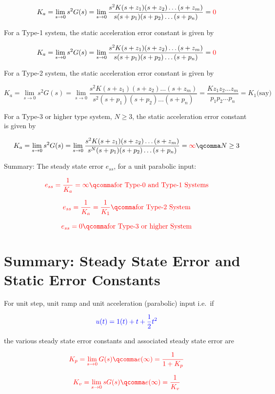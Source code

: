\documentclass[
  14pt,
  a4paper,
  oneside,
  open=any,
  a4paper,
  14pt]{report}
\begin{document}
\[
    K_a = \lim_{s \to 0} s^2G(s) = \lim_{s \to 0} \dfrac{s^2K(s+z_1)(s+z_2)\ldots(s+z_m)}{s(s+p_1)(s+p_2)\ldots(s+p_n)} = \textcolor{red}{0}
\]

For a Type-1 system, the static acceleration error constant is given by

\[
    K_a = \lim_{s \to 0} s^2G(s) = \lim_{s \to 0} \dfrac{s^2K(s+z_1)(s+z_2)\ldots(s+z_m)}{s(s+p_1)(s+p_2)\ldots(s+p_n)} = \textcolor{red}{0}
\]

For a Type-2 system, the static acceleration error constant is given by

\[
    K_a = \lim_{s \to 0} s^2G(s) = \lim_{s \to 0} \dfrac{s^2K(s+z_1)(s+z_2)\ldots(s+z_m)}{s^2(s+p_1)(s+p_2)\ldots(s+p_n)} = \dfrac{Kz_1z_2\ldots z_m}{p_1p_2\ldots p_n} = K_1 \text{(say)}
\]

For a Type-3 or higher type system, \(N \geq 3\), the static
acceleration error constant is given by

\[
    K_a = \lim_{s \to 0} s^2G(s) = \lim_{s \to 0} \dfrac{s^2K(s+z_1)(s+z_2)\ldots(s+z_m)}{s^N(s+p_1)(s+p_2)\ldots(s+p_n)} = \textcolor{red}{\infty}\qcomma N \geq 3
\]

Summary: The steady state error \(e_{ss}\), for a unit parabolic input:

\[
    \textcolor{red}{e_{ss} = \dfrac{1}{K_a} = \infty \qcomma \text{for Type-0 and Type-1 Systems}}
\]

\[
    \textcolor{red}{e_{ss} = \dfrac{1}{K_a} = \dfrac{1}{K_1}\qcomma \text{for Type-2 System}}
\]

\[
    \textcolor{red}{e_{ss} = 0\qcomma \text{for Type-3 or higher System}}
\]

\section{Summary: Steady State Error and Static Error
Constants}\label{summary-steady-state-error-and-static-error-constants}

For unit step, unit ramp and unit acceleration (parabolic) input i.e.~if

\[
    \textcolor{blue}{u(t)=1(t)+t+\dfrac{1}{2}t^2}
\]

the various steady state error constants and associated steady state
error are

\[
    \textcolor{red}{K_p = \lim_{s \to 0} G(s)\qcomma e(\infty) = \dfrac{1}{1+K_p}}
\]

\[
    \textcolor{red}{K_v = \lim_{s \to 0} sG(s)\qcomma e(\infty) = \dfrac{1}{K_v}}
\]
\end{document}
